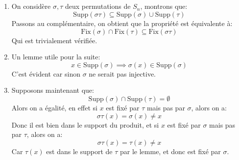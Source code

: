 \documentclass{report}
\begin{document}
      \subsection*{}
         \begin{enumerate}
            \item On considère $\sigma, \tau$ deux permutations de $S_n$, montrons que:
            $$
               \text{Supp}(\sigma\tau) \subseteq \text{Supp}(\sigma) \cup \text{Supp}(\tau)
            $$
            Passons au complémentaire, on obtient que la propriété est équivalente à:
            $$
               \text{Fix}(\sigma) \cap \text{Fix}(\tau) \subseteq \text{Fix}(\sigma\tau)
            $$
            Qui est trivialement vérifiée.
            \item Un lemme utile pour la suite:
            $$
               x \in \text{Supp}(\sigma) \implies \sigma(x) \in \text{Supp}(\sigma)
            $$
            C'est évident car sinon \(\sigma\) ne serait pas injective.
            \item Supposons maintenant que:
            $$
               \text{Supp}(\sigma) \cap \text{Supp}(\tau) = \emptyset
            $$
            Alors on a égalité, en effet si $x$ est fixé par $\tau$ mais pas par $\sigma$, alors on a:
            $$
               \sigma\tau(x) = \sigma(x) \neq x
            $$
            Donc il est bien dans le support du produit, et si $x$ est fixé par $\sigma$ mais pas par $\tau$, alors on a:
            $$
               \sigma\tau(x) = \tau(x) \neq x
            $$
            Car $\tau(x)$ est dans le support de $\tau$ par le lemme, et donc est fixé par $\sigma$.
         \end{enumerate}
          
         \pagebreak        
\end{document}
